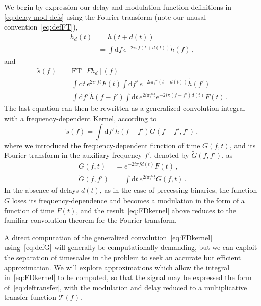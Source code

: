 \documentclass[aps,showpacs,twocolumn,
prd,superscriptaddress,nofootinbib]{revtex4-1}
\newcommand{\be}{\begin{equation}}
\newcommand{\ee}{\end{equation}}
\newcommand\ud{{\mathrm{d}}}
\newcommand{\nn}{\nonumber}
\newcommand{\jgb}[1]{{\color{DarkGreen} #1}}
\begin{document}
We begin by expression our delay and modulation function definitions in \eqref{eq:delay-mod-defs} using the Fourier transform (note our unusal convention~\eqref{eq:defFT}),
\begin{align}
h_{d}(t) & =  h(t+d(t)) \nonumber\\
&=\int \ud f \, e^{-2i\pi f (t+d(t))}\tilde{h}(f) \,,
\end{align}
and
\begin{align}
  \tilde{s}(f) &= \mathrm{FT} \left[ F h_{d}\right] (f) \nn \\
  &= \int \ud t \, e^{2i\pi f t} F(t)  \int \ud f' \, e^{-2i\pi f' (t+d(t))}\tilde{h}(f') \nn\\
	&= \int \ud f' \, \tilde{h}(f-f') \int \ud t \, e^{2i\pi f' t} e^{-2i\pi (f-f') d(t)} F(t) \,.
\end{align}
The last equation can then be rewritten as a generalized convolution integral with a frequency-dependent Kernel, according to
\be\label{eq:FDkernel}
	\tilde{s}(f) = \int \ud f' \, \tilde{h}(f-f') \tilde{G}(f-f',f') \,,
\ee
where we introduced the frequency-dependent function of time $G(f,t)$, and its Fourier transform in the auxiliary frequency $f'$, denoted by $\tilde{G}(f,f')$, as
\begin{subequations}\label{eq:defG}
\begin{align}
	G(f,t) &= e^{-2i\pi f d(t)} F(t) \,, \\
	\tilde{G}(f,f') &= \int \ud t \, e^{2i\pi f' t} G(f,t) \,.
\end{align}
\end{subequations}
In the absence of delays $d(t)$, as in the case of precessing binaries, the function $G$ loses its frequency-dependence and becomes a modulation in the form of a function of time $F(t)$, and the result~\eqref{eq:FDkernel} above reduces to the familiar convolution theorem for the Fourier transform.

A direct computation of the generalized convolution~\eqref{eq:FDkernel} using~\eqref{eq:defG} will generally be computationally demanding, but we can exploit the separation of timescales in the problem to seek an accurate but efficient approximation.  \jgb{We will explore approximations which allow the integral in~\eqref{eq:FDkernel} to be computed, so that the signal may be expressed the form of~\eqref{eq:deftransfer}, with the modulation and delay reduced to a multiplicative transfer function $\mathcal T(f)$.}
\end{document}
